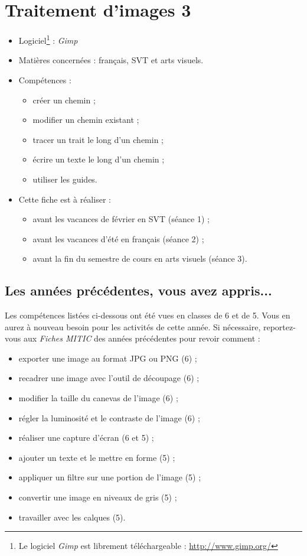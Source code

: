 \chapter{Traitement d'images 3}  

{\footnotesize
\begin{itemize}
\item Logiciel\footnote{Le logiciel \emph{Gimp} est librement téléchargeable : \url{http://www.gimp.org/}} : \emph{Gimp}
\item Matières concernées : français, SVT et arts visuels.
\item Compétences : 
        \begin{itemize}
        \item créer un chemin ;
	\item modifier un chemin existant ;
	\item tracer un trait le long d'un chemin ;
	\item écrire un texte le long d'un chemin ;
	\item utiliser les guides.
        \end{itemize}
\item Cette fiche est à réaliser :
        \begin{itemize}
	\item avant les vacances de février en SVT (séance 1) ;
        \item avant les vacances d'été en français (séance 2) ;
        \item avant la fin du semestre de cours en arts visuels (séance 3).
        \end{itemize}
\end{itemize}
} %


\section*{Les années précédentes, vous avez appris...}

Les compétences listées ci-dessous ont été vues en classes de 6 et de 5. Vous en aurez à nouveau besoin pour les activités de cette année. Si nécessaire, reportez-vous aux \emph{Fiches MITIC} des années précédentes pour revoir comment :  

\begin{itemize}
\item exporter une image au format JPG ou PNG (6) ;
\item recadrer une image avec l'outil de découpage (6) ;
\item modifier la taille du canevas de l'image (6) ;
\item régler la luminosité et le contraste de l'image (6) ;
\item réaliser une capture d'écran (6 et 5) ;
\item ajouter un texte et le mettre en forme (5) ;
\item appliquer un filtre sur une portion de l'image (5) ;
\item convertir une image en niveaux de gris (5) ;
\item travailler avec les calques (5). 
\end{itemize}


